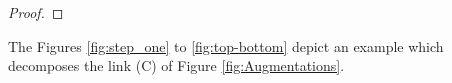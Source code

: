 \documentclass[11pt]{amsart}
\newcommand{\figref}[1]{Figure \ref{#1}}
\newcommand{\torus}{{\mathbb{T}^2}}
\theoremstyle{plain}
\theoremstyle{definition}
\begin{document}
\begin{proof}
\end{proof}




The Figures \ref{fig:step_one} to \ref{fig:top-bottom}
depict an example which decomposes the link (C) of Figure
\ref{fig:Augmentations}. 
\end{document}

